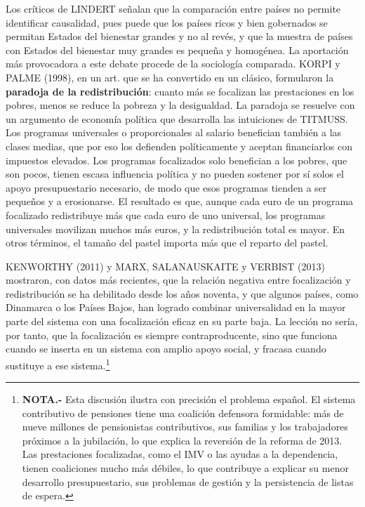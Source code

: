 \documentclass[10pt,a4paper]{article}
\begin{document}
Los críticos de LINDERT señalan que la comparación entre países no permite identificar causalidad, pues puede que los países ricos y bien gobernados se permitan Estados del bienestar grandes y no al revés, y que la muestra de países con Estados del bienestar muy grandes es pequeña y homogénea. La aportación más provocadora a este debate procede de la sociología comparada. KORPI y PALME (1998), en un art. que se ha convertido en un clásico, formularon la \textbf{paradoja de la redistribución}: cuanto más se focalizan las prestaciones en los pobres, menos se reduce la pobreza y la desigualdad. La paradoja se resuelve con un argumento de economía política que desarrolla las intuiciones de TITMUSS. Los programas universales o proporcionales al salario benefician también a las clases medias, que por eso los defienden políticamente y aceptan financiarlos con impuestos elevados. Los programas focalizados solo benefician a los pobres, que son pocos, tienen escasa influencia política y no pueden sostener por sí solos el apoyo presupuestario necesario, de modo que esos programas tienden a ser pequeños y a erosionarse. El resultado es que, aunque cada euro de un programa focalizado redistribuye más que cada euro de uno universal, los programas universales movilizan muchos más euros, y la redistribución total es mayor. En otros términos, el tamaño del pastel importa más que el reparto del pastel.

KENWORTHY (2011) y MARX, SALANAUSKAITE y VERBIST (2013) mostraron, con datos más recientes, que la relación negativa entre focalización y redistribución se ha debilitado desde los años noventa, y que algunos países, como Dinamarca o los Países Bajos, han logrado combinar universalidad en la mayor parte del sistema con una focalización eficaz en su parte baja. La lección no sería, por tanto, que la focalización es siempre contraproducente, sino que funciona cuando se inserta en un sistema con amplio apoyo social, y fracasa cuando sustituye a ese sistema.\footnote{\textbf{NOTA.-} Esta discusión ilustra con precisión el problema español. El sistema contributivo de pensiones tiene una coalición defensora formidable: más de nueve millones de pensionistas contributivos, sus familias y los trabajadores próximos a la jubilación, lo que explica la reversión de la reforma de 2013. Las prestaciones focalizadas, como el IMV o las ayudas a la dependencia, tienen coaliciones mucho más débiles, lo que contribuye a explicar su menor desarrollo presupuestario, sus problemas de gestión y la persistencia de listas de espera.
}
\end{document}
